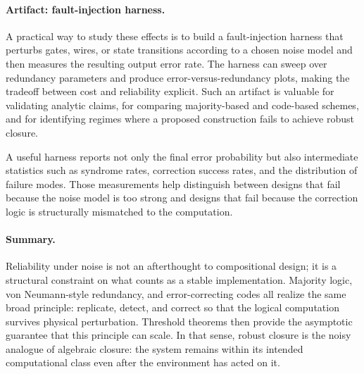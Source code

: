 \documentclass[11pt]{article}
\begin{document}
\paragraph{Artifact: fault-injection harness.}
A practical way to study these effects is to build a fault-injection harness that perturbs gates, wires, or state transitions according to a chosen noise model and then measures the resulting output error rate. The harness can sweep over redundancy parameters and produce error-versus-redundancy plots, making the tradeoff between cost and reliability explicit. Such an artifact is valuable for validating analytic claims, for comparing majority-based and code-based schemes, and for identifying regimes where a proposed construction fails to achieve robust closure.

A useful harness reports not only the final error probability but also intermediate statistics such as syndrome rates, correction success rates, and the distribution of failure modes. Those measurements help distinguish between designs that fail because the noise model is too strong and designs that fail because the correction logic is structurally mismatched to the computation.

\paragraph{Summary.}
Reliability under noise is not an afterthought to compositional design; it is a structural constraint on what counts as a stable implementation. Majority logic, von Neumann-style redundancy, and error-correcting codes all realize the same broad principle: replicate, detect, and correct so that the logical computation survives physical perturbation. Threshold theorems then provide the asymptotic guarantee that this principle can scale. In that sense, robust closure is the noisy analogue of algebraic closure: the system remains within its intended computational class even after the environment has acted on it.
\end{document}
